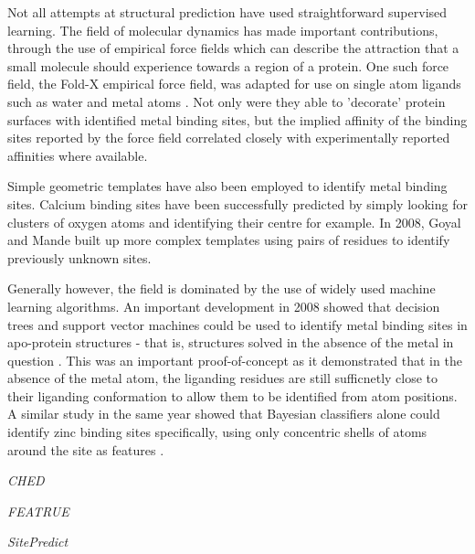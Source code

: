 Not all attempts at structural prediction have used straightforward supervised learning. The field of molecular dynamics has made important contributions, through the use of empirical force fields which can describe the attraction that a small molecule should experience towards a region of a protein. One such force field, the Fold-X empirical force field, was adapted for use on single atom ligands such as water and metal atoms . Not only were they able to 'decorate' protein surfaces with identified metal binding sites, but the implied affinity of the binding sites reported by the force field correlated closely with experimentally reported affinities where available.

Simple geometric templates have also been employed to identify metal binding sites. Calcium binding sites have been successfully predicted by simply looking for clusters of oxygen atoms and identifying their centre \cite{deng2006} for example. In 2008, Goyal and Mande built up more complex templates using pairs of residues to identify previously unknown 
sites.

Generally however, the field is dominated by the use of widely used machine learning algorithms. An important development in 2008 showed that decision trees and support vector machines could be used to identify metal binding sites in apo-protein structures - that is, structures solved in the absence of the metal in question \cite{babor2008}. This was an important proof-of-concept as it demonstrated that in the absence of the metal atom, the liganding residues are still sufficnetly close to their liganding conformation to allow them to be identified from atom positions. A similar study in the same year showed that Bayesian classifiers alone could identify zinc binding sites specifically, using only concentric shells of atoms around the site as features \cite{ebert2008}.

\emph{CHED}

\emph{FEATRUE}

\emph{SitePredict}


